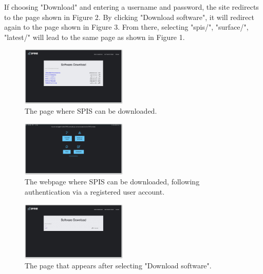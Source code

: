 \documentclass[a4paper, 11pt]{article}
\begin{document}
If choosing "Download" and entering a username and password, the site redirects to the page shown in Figure 2. By clicking "Download software", it will redirect again to the page shown in Figure 3. From there, selecting "spis/", "surface/", "latest/" will lead to the same page as shown in Figure 1.

\begin{figure}[!ht]
    \centering
    \includegraphics[width=0.45\textwidth]{fig1.jpg}
    \caption{The page where SPIS can be downloaded.}
\end{figure}

\begin{figure}[!ht]
    \centering
    \includegraphics[width=0.45\textwidth]{fig2.jpg}
    \caption{The webpage where SPIS can be downloaded, following authentication via a registered user account.}
\end{figure}

\begin{figure}[!ht]
    \centering
    \includegraphics[width=0.45\textwidth]{fig3.jpg}
    \caption{The page that appears after selecting "Download software".}
\end{figure}
\end{document}
